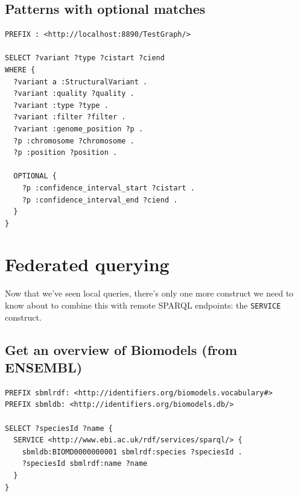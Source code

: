 \documentclass[11pt,a4paper,oneside]{book}
\begin{document}
\subsection{Patterns with optional matches}
\begin{siderules}
\begin{verbatim}
PREFIX : <http://localhost:8890/TestGraph/>

SELECT ?variant ?type ?cistart ?ciend
WHERE {
  ?variant a :StructuralVariant .
  ?variant :quality ?quality .
  ?variant :type ?type .
  ?variant :filter ?filter .
  ?variant :genome_position ?p .
  ?p :chromosome ?chromosome .
  ?p :position ?position .

  OPTIONAL {
    ?p :confidence_interval_start ?cistart .
    ?p :confidence_interval_end ?ciend .
  }
}
\end{verbatim}
\end{siderules}

\section{Federated querying}

  Now that we've seen local queries, there's only one more construct we need to
  know about to combine this with remote SPARQL endpoints: the \texttt{SERVICE}
  construct.
  
\subsection{Get an overview of Biomodels (from ENSEMBL)}
\begin{siderules}
\begin{verbatim}
PREFIX sbmlrdf: <http://identifiers.org/biomodels.vocabulary#>
PREFIX sbmldb: <http://identifiers.org/biomodels.db/>

SELECT ?speciesId ?name {
  SERVICE <http://www.ebi.ac.uk/rdf/services/sparql/> {
    sbmldb:BIOMD0000000001 sbmlrdf:species ?speciesId .
    ?speciesId sbmlrdf:name ?name
  }
}
\end{verbatim}
\end{siderules}
\end{document}
